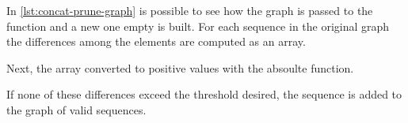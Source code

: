 In \cref{lst:concat-prune-graph} is possible to see how the graph is passed to the function and a new one empty is built. 
For each sequence in the original graph the differences among the elements are computed as an array. 

Next, the array converted to positive values with the absoulte function. 

If none of these differences exceed the threshold desired, the sequence is added to the graph of valid sequences. 


